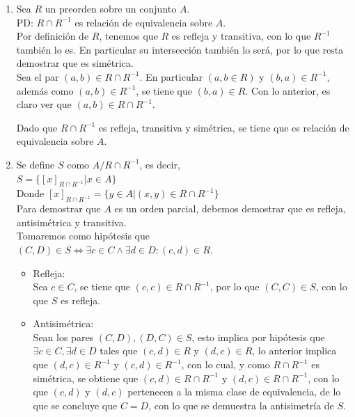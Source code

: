 \documentclass[12pt]{article}
\begin{document}
\begin{enumerate}

    \item Sea $R$ un preorden sobre un conjunto $A$.\\
    PD: $R \cap  R^{-1}$ es relación de equivalencia sobre $A$.\\
    
    Por definición de $R$, tenemos que $R$ es refleja y transitiva, con lo que $R^{-1}$
    también lo es. En particular su intersección también lo será, por lo que resta demostrar que es simétrica.\\

    Sea el par $(a, b) \in R \cap  R^{-1}$.
    En particular $(a, b \in R)$ y $(b, a) \in R^{-1}$, además como $(a, b) \in R^{-1}$, se tiene que $(b, a) \in R$.
    Con lo anterior, es claro ver que $(a, b) \in R \cap R^{-1}$.

    Dado que $R \cap R^{-1}$ es refleja, transitiva y simétrica, se tiene que es relación de equivalencia sobre $A$.
    
    \item Se define $S$ como $A / R \cap R^{-1}$, es decir,\\
    $S = \{[x]_{R \cap R^{-1}} | x \in A\}$\\
    Donde $[x]_{R \cap R^{-1}} = \{y \in A| (x, y) \in R \cap R^{-1}\}$\\

    Para demostrar que $A$ es un orden parcial, debemos demostrar que es refleja, antisimétrica y transitiva.\\
    Tomaremos como hipótesis que \\
    $(C, D) \in S \Longleftrightarrow \exists c \in C \wedge \exists d \in D : (c, d) \in R$.

    \begin{itemize}
        \item Refleja:\\
        Sea $c \in C$, se tiene que $(c, c) \in R \cap R^{-1}$, por lo que $(C, C) \in S$,
        con lo que $S$ es refleja.

        \item Antisimétrica:\\
        Sean los pares $(C, D), (D, C) \in S$, esto implica por hipótesis que $\exists c \in C, \exists d \in D$ tales que
        $(c, d) \in R$ y $(d, c) \in R$, lo anterior implica que $(d, c) \in R^{-1}$ y $(c, d) \in R^{-1}$,
        con lo cual, y como $R \cap R^{-1}$ es simétrica, se obtiene que $(c, d) \in R \cap R^{-1}$ y $(d, c) \in R \cap R^{-1}$,
        con lo que $(c, d)$ y $(d, c)$ pertenecen a la misma clase de equivalencia, de lo que se concluye que $C = D$,
        con lo que se demuestra la antisimetría de $S$.


\end{itemize}
\end{enumerate}
\end{document}
